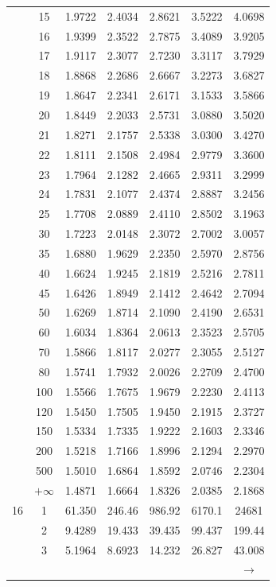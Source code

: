 \begin{minipage}{0.49\textwidth}
\begin{center}
\begin{tabular}{ccccccc}
			& 15 & 1.9722 & 2.4034 & 2.8621 & 3.5222 & 4.0698 \\
			& 16 & 1.9399 & 2.3522 & 2.7875 & 3.4089 & 3.9205 \\
			& 17 & 1.9117 & 2.3077 & 2.7230 & 3.3117 & 3.7929 \\
			& 18 & 1.8868 & 2.2686 & 2.6667 & 3.2273 & 3.6827 \\
			& 19 & 1.8647 & 2.2341 & 2.6171 & 3.1533 & 3.5866 \\[5pt]
			& 20 & 1.8449 & 2.2033 & 2.5731 & 3.0880 & 3.5020 \\
			& 21 & 1.8271 & 2.1757 & 2.5338 & 3.0300 & 3.4270 \\
			& 22 & 1.8111 & 2.1508 & 2.4984 & 2.9779 & 3.3600 \\
			& 23 & 1.7964 & 2.1282 & 2.4665 & 2.9311 & 3.2999 \\
			& 24 & 1.7831 & 2.1077 & 2.4374 & 2.8887 & 3.2456 \\
			& 25 & 1.7708 & 2.0889 & 2.4110 & 2.8502 & 3.1963 \\
			& 30 & 1.7223 & 2.0148 & 2.3072 & 2.7002 & 3.0057 \\
			& 35 & 1.6880 & 1.9629 & 2.2350 & 2.5970 & 2.8756 \\
			& 40 & 1.6624 & 1.9245 & 2.1819 & 2.5216 & 2.7811 \\
			& 45 & 1.6426 & 1.8949 & 2.1412 & 2.4642 & 2.7094 \\[5pt]
			& 50 & 1.6269 & 1.8714 & 2.1090 & 2.4190 & 2.6531 \\
			& 60 & 1.6034 & 1.8364 & 2.0613 & 2.3523 & 2.5705 \\
			& 70 & 1.5866 & 1.8117 & 2.0277 & 2.3055 & 2.5127 \\
			& 80 & 1.5741 & 1.7932 & 2.0026 & 2.2709 & 2.4700 \\
			& 100 & 1.5566 & 1.7675 & 1.9679 & 2.2230 & 2.4113 \\
			& 120 & 1.5450 & 1.7505 & 1.9450 & 2.1915 & 2.3727 \\
			& 150 & 1.5334 & 1.7335 & 1.9222 & 2.1603 & 2.3346 \\
			& 200 & 1.5218 & 1.7166 & 1.8996 & 2.1294 & 2.2970 \\
			& 500 & 1.5010 & 1.6864 & 1.8592 & 2.0746 & 2.2304 \\
			& $+\infty$ & 1.4871 & 1.6664 & 1.8326 & 2.0385 & 2.1868 \\
			\midrule
			16 & 1 & 61.350 & 246.46 & 986.92 & 6170.1 & 24681 \\
			& 2 & 9.4289 & 19.433 & 39.435 & 99.437 & 199.44 \\
			& 3 & 5.1964 & 8.6923 & 14.232 & 26.827 & 43.008 \\
			&  &  &  &  &  & $\rightarrow$ \\
		\end{tabular}
	\end{center}
\end{minipage}


